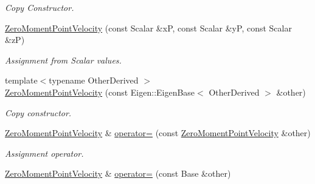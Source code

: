 \begin{DoxyCompactItemize}
\begin{DoxyCompactList}\small\item\em Copy Constructor. \end{DoxyCompactList}\item 
\hyperlink{classow__core_1_1ZeroMomentPointVelocity_a6cd4d247583195059848109e712d6364}{Zero\+Moment\+Point\+Velocity} (const Scalar \&xP, const Scalar \&yP, const Scalar \&zP)\hypertarget{classow__core_1_1ZeroMomentPointVelocity_a6cd4d247583195059848109e712d6364}{}\label{classow__core_1_1ZeroMomentPointVelocity_a6cd4d247583195059848109e712d6364}

\begin{DoxyCompactList}\small\item\em Assignment from Scalar values. \end{DoxyCompactList}\item 
{\footnotesize template$<$typename Other\+Derived $>$ }\\\hyperlink{classow__core_1_1ZeroMomentPointVelocity_a75282e87eb6fafaa374fbd1145d3e3fe}{Zero\+Moment\+Point\+Velocity} (const Eigen\+::\+Eigen\+Base$<$ Other\+Derived $>$ \&other)
\begin{DoxyCompactList}\small\item\em Copy constructor. \end{DoxyCompactList}\item 
\hyperlink{classow__core_1_1ZeroMomentPointVelocity}{Zero\+Moment\+Point\+Velocity} \& \hyperlink{classow__core_1_1ZeroMomentPointVelocity_a31a9d9b8d53333f0f400cf8e59c14013}{operator=} (const \hyperlink{classow__core_1_1ZeroMomentPointVelocity}{Zero\+Moment\+Point\+Velocity} \&other)\hypertarget{classow__core_1_1ZeroMomentPointVelocity_a31a9d9b8d53333f0f400cf8e59c14013}{}\label{classow__core_1_1ZeroMomentPointVelocity_a31a9d9b8d53333f0f400cf8e59c14013}

\begin{DoxyCompactList}\small\item\em Assignment operator. \end{DoxyCompactList}\item 
\hyperlink{classow__core_1_1ZeroMomentPointVelocity}{Zero\+Moment\+Point\+Velocity} \& \hyperlink{classow__core_1_1ZeroMomentPointVelocity_a62afe938b8a16091c817e24045186eee}{operator=} (const Base \&other)\hypertarget{classow__core_1_1ZeroMomentPointVelocity_a62afe938b8a16091c817e24045186eee}{}\label{classow__core_1_1ZeroMomentPointVelocity_a62afe938b8a16091c817e24045186eee}


\end{DoxyCompactItemize}

